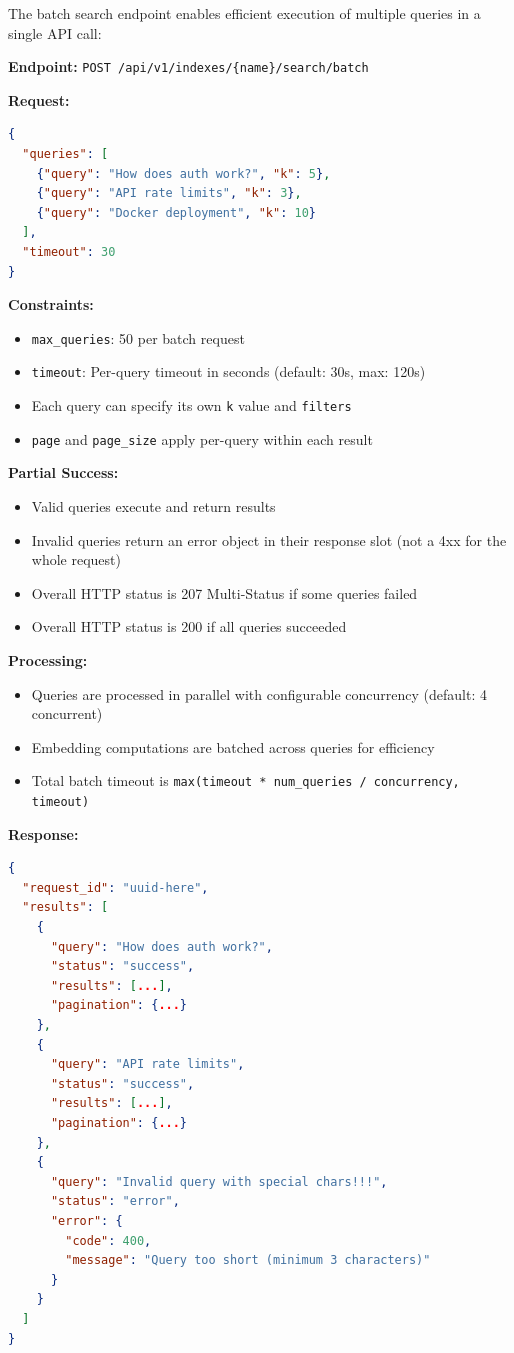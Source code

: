 \documentclass[11pt,a4paper]{article}
\newcommand{\inlinecode}[1]{\texttt{\small\colorbox{ctCodeBg}{#1}}}
\newcommand{\apipath}[1]{\texttt{\small\textcolor{ctAccentBlue}{#1}}}
\begin{document}
\begin{reqbox}
The batch search endpoint enables efficient execution of multiple queries in a single API call:

\textbf{Endpoint:} \apipath{POST /api/v1/indexes/\{name\}/search/batch}

\textbf{Request:}
\begin{lstlisting}[language=JSON]
{
  "queries": [
    {"query": "How does auth work?", "k": 5},
    {"query": "API rate limits", "k": 3},
    {"query": "Docker deployment", "k": 10}
  ],
  "timeout": 30
}
\end{lstlisting}

\textbf{Constraints:}
\begin{itemize}
    \item \inlinecode{max\_queries}: 50 per batch request
    \item \inlinecode{timeout}: Per-query timeout in seconds (default: 30s, max: 120s)
    \item Each query can specify its own \inlinecode{k} value and \inlinecode{filters}
    \item \inlinecode{page} and \inlinecode{page\_size} apply per-query within each result
\end{itemize}

\textbf{Partial Success:}
\begin{itemize}
    \item Valid queries execute and return results
    \item Invalid queries return an error object in their response slot (not a 4xx for the whole request)
    \item Overall HTTP status is 207 Multi-Status if some queries failed
    \item Overall HTTP status is 200 if all queries succeeded
\end{itemize}

\textbf{Processing:}
\begin{itemize}
    \item Queries are processed in parallel with configurable concurrency (default: 4 concurrent)
    \item Embedding computations are batched across queries for efficiency
    \item Total batch timeout is \inlinecode{max(timeout * num\_queries / concurrency, timeout)}
\end{itemize}

\textbf{Response:}
\begin{lstlisting}[language=JSON]
{
  "request_id": "uuid-here",
  "results": [
    {
      "query": "How does auth work?",
      "status": "success",
      "results": [...],
      "pagination": {...}
    },
    {
      "query": "API rate limits",
      "status": "success",
      "results": [...],
      "pagination": {...}
    },
    {
      "query": "Invalid query with special chars!!!",
      "status": "error",
      "error": {
        "code": 400,
        "message": "Query too short (minimum 3 characters)"
      }
    }
  ]
}
\end{lstlisting}
\end{reqbox}
\end{document}
